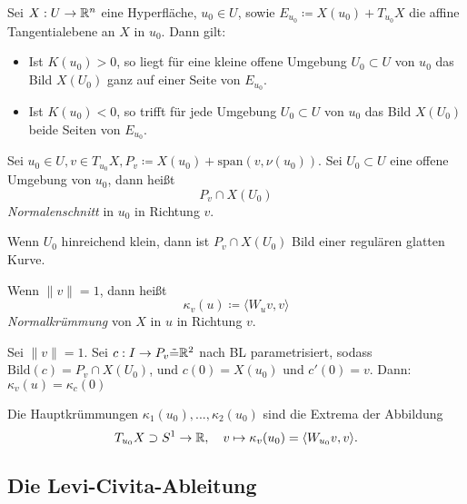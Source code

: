 \documentclass{cheat-sheet}
\newcommand{\Span}{\mathrm{span}}
\newcommand{\Bild}{\mathrm{Bild}}
\begin{document}
\begin{satz}
  Sei $X : U \to \mathbb{R}^n$ eine Hyperfläche, $u_0 \in U$, sowie $E_{u_0} \coloneqq X(u_0) + T_{u_0} X$ die affine Tangentialebene an $X$ in $u_0$. Dann gilt:
  \begin{itemize}
    \item Ist $K(u_0) > 0$, so liegt für eine kleine offene Umgebung $U_0 \subset U$ von $u_0$ das Bild $X(U_0)$ ganz auf einer Seite von $E_{u_0}$.
    \item Ist $K(u_0) < 0$, so trifft für jede Umgebung $U_0 \subset U$ von $u_0$ das Bild $X(U_0)$ beide Seiten von $E_{u_0}$.
  \end{itemize}
\end{satz}


\begin{definition}
  Sei $u_0 \in U, v \in T_{u_0} X, P_v \coloneqq X(u_0) + \Span(v, \nu(u_0))$.
  Sei $U_0 \subset U$ eine offene Umgebung von $u_0$, dann heißt
  \[ P_v \cap X(U_0) \]
  \emph{Normalenschnitt} in $u_0$ in Richtung $v$.
\end{definition}

\begin{satz}
  Wenn $U_0$ hinreichend klein, dann ist $P_v \cap X(U_0)$ Bild einer regulären glatten Kurve.
\end{satz}

\begin{definition}
  Wenn $\| v \| = 1$, dann heißt
  \[ \kappa_v(u) \coloneqq \langle W_u v, v \rangle \]
  \emph{Normalkrümmung} von $X$ in $u$ in Richtung $v$.
\end{definition}

\begin{bem}
  Sei $\|v\| = 1$. Sei $c : I \to P_v \tilde{=} \mathbb{R}^2$ nach BL parametrisiert, sodass $\Bild(c) = P_v \cap X(U_0)$, und $c(0) = X(u_0)$ und $c'(0) = v$. Dann: $\kappa_v(u) = \kappa_c(0)$
\end{bem}

\begin{satz}
  Die Hauptkrümmungen $\kappa_1(u_0), ..., \kappa_2(u_0)$ sind die Extrema der Abbildung
  \[ T_{u_0} X \supset S^1 \to \mathbb{R}, \quad v \mapsto \kappa_v(u_0) = \langle W_{u_0} v, v \rangle. \]
\end{satz}


\subsection{Die Levi-Civita-Ableitung}
\end{document}
